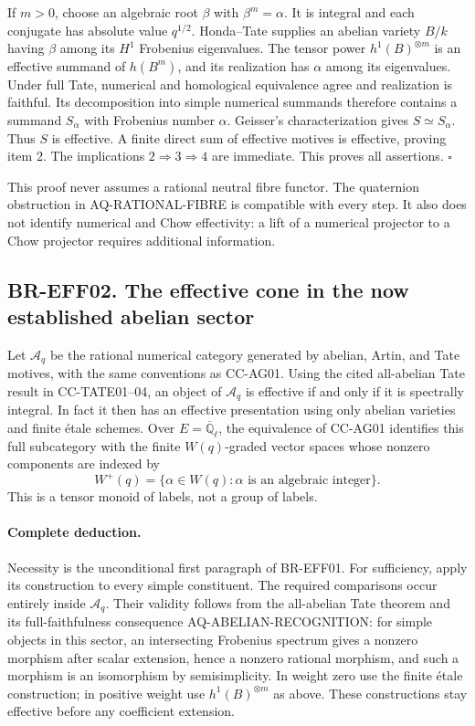 \documentclass[11pt,a4paper]{article}
\theoremstyle{definition}\newtheorem{definition}[theorem]{Definition}
\theoremstyle{remark}\newtheorem{remark}[theorem]{Remark}
\begin{document}
If $m>0$, choose an algebraic root $\beta$ with $\beta^m=\alpha$.
It is integral and each conjugate has absolute value $q^{1/2}$.
Honda--Tate supplies an abelian variety $B/k$ having $\beta$ among
its $H^1$ Frobenius eigenvalues.  The tensor power
$h^1(B)^{\otimes m}$ is an effective summand of $h(B^m)$, and its
realization has $\alpha$ among its eigenvalues.  Under full Tate,
numerical and homological equivalence agree and realization is
faithful.  Its decomposition into simple numerical summands
therefore contains a summand $S_\alpha$ with Frobenius number
$\alpha$.  Geisser's characterization gives $S\simeq S_\alpha$.
Thus $S$ is effective.  A finite direct sum of effective motives
is effective, proving item 2.  The implications $2\Rightarrow3
\Rightarrow4$ are immediate.  This proves all assertions.
\(\square\)

This proof never assumes a rational neutral fibre functor.
The quaternion obstruction in AQ-RATIONAL-FIBRE is compatible
with every step.  It also does not identify numerical and Chow
effectivity: a lift of a numerical projector to a Chow projector
requires additional information.

\subsection{BR-EFF02. The effective cone in the now established abelian sector}
Let $\mathcal A_q$ be the rational numerical category generated by
abelian, Artin, and Tate motives, with the same conventions as
CC-AG01.  Using the cited all-abelian Tate result in CC-TATE01--04,
an object of $\mathcal A_q$ is effective if and only if it is
spectrally integral.  In fact it then has an effective presentation
using only abelian varieties and finite \'etale schemes.  Over
$E=\overline{\mathbb Q}_\ell$, the equivalence of CC-AG01 identifies
this full subcategory with the finite $W(q)$-graded vector spaces
whose nonzero components are indexed by
\[
 W^+(q)=\{\alpha\in W(q):\alpha\text{ is an algebraic integer}\}.
 \tag{EFF.1}
\]
This is a tensor monoid of labels, not a group of labels.

\paragraph{Complete deduction.}
Necessity is the unconditional first paragraph of BR-EFF01.
For sufficiency, apply its construction to every simple constituent.
The required comparisons occur entirely inside $\mathcal A_q$.
Their validity follows from the all-abelian Tate theorem and its
full-faithfulness consequence AQ-ABELIAN-RECOGNITION: for simple
objects in this sector, an intersecting Frobenius spectrum gives a
nonzero morphism after scalar extension, hence a nonzero rational
morphism, and such a morphism is an isomorphism by semisimplicity.
In weight zero use the finite \'etale construction; in positive
weight use $h^1(B)^{\otimes m}$ as above.  These constructions
stay effective before any coefficient extension.
\end{document}
